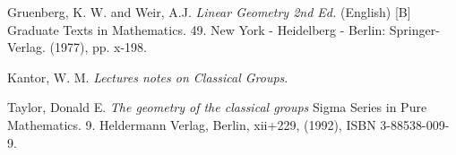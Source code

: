 \documentclass[12pt]{article}
\begin{document}

\providecommand{\bysame}{\leavevmode\hbox to3em{\hrulefill}\thinspace}
\providecommand{\MR}{\relax\ifhmode\unskip\space\fi MR }
\providecommand{\MRhref}[2]{%
\href{http://www.ams.org/mathscinet-getitem?mr=#1}{#2}
}
\providecommand{\href}[2]{#2}
\begin{thebibliography}{10}


Gruenberg, K. W. and Weir, A.J.
\emph{Linear Geometry 2nd Ed.} (English)
[B] Graduate Texts in Mathematics. 49. New York - Heidelberg - Berlin: Springer-Verlag. (1977), pp. x-198.

Kantor, W. M.
\emph{Lectures notes on Classical Groups}.

Taylor, Donald E.
\emph{The geometry of the classical groups}
Sigma Series in Pure Mathematics. 9.
Heldermann Verlag, Berlin, xii+229, (1992), ISBN 3-88538-009-9.



\end{thebibliography}

\end{document}
